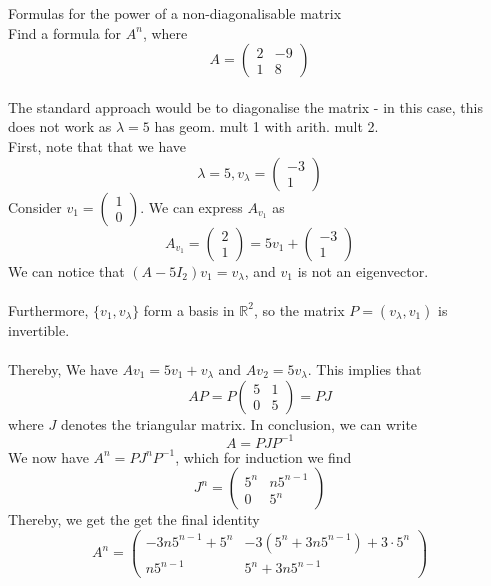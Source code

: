 \documentclass[journal, letterpaper]{IEEEtran}
\begin{document}
    \begin{myboxg}{Formulas for the power of a non-diagonalisable matrix} \\
        Find a formula for $A^n$, where
        $$ A = \begin{pmatrix}
            2 & -9 \\ 1 & 8
        \end{pmatrix}$$
        \newline \\ 
        The standard approach would be to diagonalise the matrix - in this case, this does not work as 
        $\lambda = 5$ has geom. mult 1 with arith. mult 2.
        \newline \\ 
        First, note that that we have
        $$ \lambda = 5, v_\lambda = \begin{pmatrix}
            -3 \\ 1
        \end{pmatrix}$$
        Consider $v_1 = \begin{pmatrix}
            1 \\ 0
        \end{pmatrix}$.
        We can express $A_{v_1}$ as
        $$ A_{v_1} = \begin{pmatrix}
            2 \\ 1
        \end{pmatrix} = 5v_1 + \begin{pmatrix}
            -3 \\ 1
        \end{pmatrix}$$
        We can notice that $(A - 5I_2)v_1 = v_\lambda$, and $v_1$ is not an eigenvector. \\ \\
        Furthermore, $\{v_1, v_\lambda\}$ form a basis in $\mathbb{R}^2$, so the matrix $P = (v_\lambda, v_1)$ is invertible. \\ \\
        Thereby, We have $Av_1 = 5v_1 + v_\lambda$ and $Av_2 = 5v_\lambda$. This implies that
        $$ AP = P\begin{pmatrix}
            5 & 1 \\ 0 & 5
        \end{pmatrix} = PJ$$
        where $J$ denotes the triangular matrix. In conclusion, we can write
        $$ A = PJP^{-1}$$
        We now have $A^n = PJ^nP^{-1}$, which for induction we find
        $$ J^n = \begin{pmatrix}
            5^n & n5^{n-1} \\ 0 & 5^n
        \end{pmatrix}$$
        Thereby, we get the get the final identity
        $$ A^n = \begin{pmatrix}
            -3n5^{n-1} + 5^n & -3(5^n + 3n5^{n-1}) + 3 \cdot 5^n \\ 
            n5^{n-1} & 5^n + 3n5^{n-1}
        \end{pmatrix}$$
    \end{myboxg}
\end{document}
